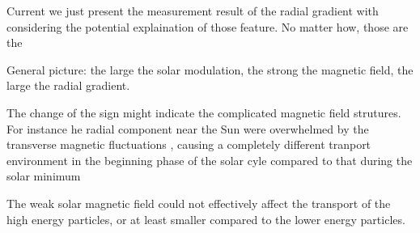 Current we just present the measurement result of the radial gradient with considering the potential explaination of those feature. No matter how, those are the 

General picture: the large the solar modulation, the strong the magnetic field, the large the radial gradient.

The change of the sign might indicate the complicated magnetic field strutures. For instance he radial component near the Sun were overwhelmed by the transverse magnetic fluctuations \citep{Rankin2022ApJ}, causing a completely different tranport environment in the beginning phase of the solar cyle compared to that during the solar minimum

The weak solar magnetic field could not effectively affect the transport of the high energy particles, or at least smaller compared to the lower energy particles.





%
